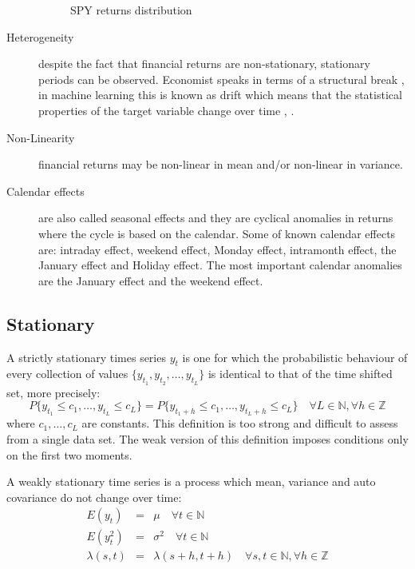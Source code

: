 \begin{description}
\begin{figure}[h]
 \caption{SPY returns distribution}
 \label{fig:returndist}
\end{figure}
\item[Heterogeneity] despite the fact that financial returns are non-stationary,
stationary periods can be observed. Economist speaks in terms of a structural
break \cite{stock1994}, in machine learning this is known as drift which means
that the statistical properties of the target variable change over time
\cite{widmer1996}, \cite{tsymbal2004}.
\item[Non-Linearity] financial returns may be non-linear in mean and/or
non-linear in variance.
\item[Calendar effects] are also called seasonal effects and they are cyclical
anomalies in returns where the cycle is based on the calendar. Some of known
calendar effects are: intraday effect, weekend effect, Monday effect, intramonth
effect, the January effect and Holiday effect. The most important calendar
anomalies are the January effect and the weekend effect. 
\end{description}

\vspace{15mm}

\subsection{Stationary }
A strictly stationary times series $y_t$ is one for which the probabilistic behaviour
of every collection of values $\{y_{t_1},y_{t_2},\dots,y_{t_L}\}$ is identical
to that of the time shifted set, more precisely: \[ P\{y_{t_1} \leq
c_1,\dots,y_{t_L} \leq c_L\} = P\{y_{t_1+h} \leq c_1,\dots,y_{t_L+h} \leq c_L\}
\quad \forall L \in \mathbb{N}, \forall h \in \mathbb{Z}\] \noindent where
$c_1,\dots,c_L$ are constants.  This definition is too strong and difficult to
assess from a single data set. The weak version of this definition imposes
conditions only on the first two moments.

A weakly stationary time series is a process which mean, variance and auto
covariance do not change over time: \begin{eqnarray*} E(y_t) &=& \mu  \quad
\forall t \in \mathbb{N} \\ E(y^2_t) &=& \sigma^2  \quad \forall t \in
\mathbb{N} \\ \lambda(s,t)&=&\lambda(s+h,t+h) \quad \forall s,t \in \mathbb{N},
\forall h \in \mathbb{Z} \end{eqnarray*}

